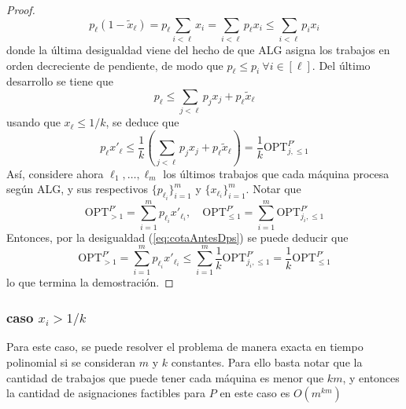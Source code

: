\documentclass[10pt]{article}
\theoremstyle{plain}
\theoremstyle{definition}
\begin{document}
\begin{proof}
\begin{equation*}
 p_\ell(1-\tilde{x}_\ell) = p_\ell\sum_{i < \ell} x_i = \sum_{i < \ell} p_\ell x_i \leq  \sum_{i < \ell} p_i x_i
\end{equation*}
donde la última desigualdad viene del hecho de que ALG asigna los trabajos en orden decreciente de pendiente, de modo que $p_\ell \leq p_i \ \forall i \in [\ell]$. Del último desarrollo se tiene que
\begin{equation}
\label{eq:cotasGan}
p_\ell \leq \sum_{j < \ell} p_j x_j + p_\ell \tilde{x}_\ell
\end{equation}
usando que $x_\ell \leq 1/k$, se deduce que
\begin{equation}
\label{eq:cotaAntesDps}
p_\ell x'_\ell \leq \frac{1}{k}\left(\sum_{j < \ell} p_j x_j + p_\ell \tilde{x}_\ell \right) = \frac{1}{k}\text{OPT}^{P'}_{j,\leq 1}
\end{equation}
Así, considere ahora $\ell_1, \ldots, \ell_m$ los \'ultimos trabajos que cada m\'aquina procesa seg\'un ALG, y sus respectivos $\{p_{\ell_i}\}_{i=1}^m$ y $\{x_{\ell_i}\}_{i=1}^m$. Notar que
$$
\text{OPT}^{P'}_{>1} = \sum_{i = 1}^m p_{\ell_i}x'_{\ell_i}, \quad   \text{OPT}^{P'}_{\leq 1}  = \sum_{i=1}^m \text{OPT}^{P'}_{j_i,\leq 1}  
$$
Entonces, por la desigualdad (\ref{eq:cotaAntesDps}) se puede deducir que
\begin{equation*}
\text{OPT}^{P'}_{>1} = \sum_{i = 1}^m p_{\ell_i} x'_{\ell_i} \leq \sum_{i=1}^m \frac{1}{k} \text{OPT}^{P'}_{j_i,\leq 1} = \frac{1}{k} \text{OPT}^{P'}_{\leq 1}
\end{equation*}
lo que termina la demostración.
\end{proof}
\subsubsection{caso $x_i >1/k$}
Para este caso, se puede resolver el problema de manera exacta en tiempo polinomial si se consideran $m$ y $k$ constantes. Para ello basta notar que la cantidad de trabajos que puede tener cada m\'aquina es menor que $km$, y entonces la cantidad de asignaciones factibles para $P$ en este caso es $O(m^{km})$
\end{document}
